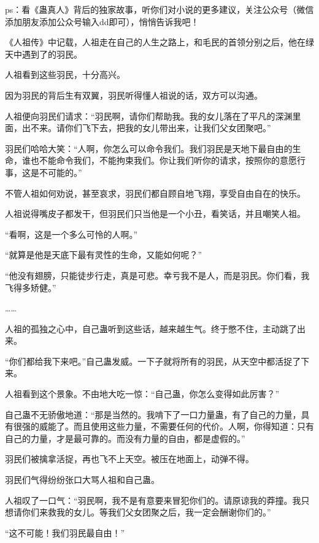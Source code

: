 
\begin{this_body}

ps：看《蛊真人》背后的独家故事，听你们对小说的更多建议，关注公众号（微信添加朋友添加公众号输入dd即可），悄悄告诉我吧！

《人祖传》中记载，人祖走在自己的人生之路上，和毛民的首领分别之后，他在绿天中遇到了的羽民。

人祖看到这些羽民，十分高兴。

因为羽民的背后生有双翼，羽民听得懂人祖说的话，双方可以沟通。

人祖便向羽民们请求：“羽民啊，请你们帮助我。我的女儿落在了平凡的深渊里面，出不来。请你们飞下去，把我的女儿带出来，让我们父女团聚吧。”

羽民们哈哈大笑：“人啊，你怎么可以命令我们。我们羽民是天地下最自由的生命，谁也不能命令我们，不能拘束我们。你让我们听你的请求，按照你的意愿行事，这是不可能的。”

不管人祖如何劝说，甚至哀求，羽民们都自顾自地飞翔，享受自由自在的快乐。

人祖说得嘴皮子都发干，但羽民们只当他是一个小丑，看笑话，并且嘲笑人祖。

“看啊，这是一个多么可怜的人啊。”

“就算是他是天底下最有灵性的生命，又能如何呢？”

“他没有翅膀，只能徒步行走，真是可悲。幸亏我不是人，而是羽民。你们看，我飞得多矫健。”

……

人祖的孤独之心中，自己蛊听到这些话，越来越生气。终于憋不住，主动跳了出来。

“你们都给我下来吧。”自己蛊发威。一下子就将所有的羽民，从天空中都活捉了下来。

人祖看到这个景象。不由地大吃一惊：“自己蛊，你怎么变得如此厉害？”

自己蛊不无骄傲地道：“那是当然的。我啃下了一口力量蛊，有了自己的力量，具有很强的威能了。而且使用这些力量，不需要任何的代价。人啊，你得知道：只有自己的力量，才是最可靠的。而没有力量的自由，都是虚假的。”

羽民们被擒拿活捉，再也飞不上天空。被压在地面上，动弹不得。

羽民们气得纷纷张口大骂人祖和自己蛊。

人祖叹了一口气：“羽民啊，我不是有意要来冒犯你们的。请原谅我的莽撞。我只想请你们来救我的女儿。等我们父女团聚之后，我一定会酬谢你们的。”

“这不可能！我们羽民最自由！”


\end{this_body}

